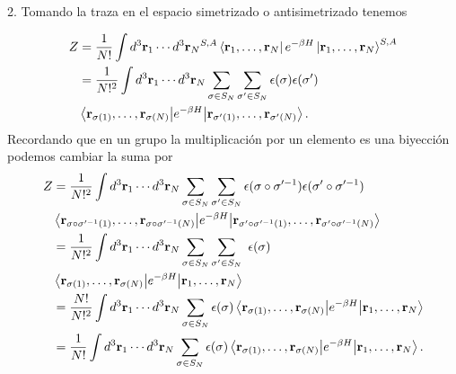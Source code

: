 \documentclass{article}
\begin{document}
2. Tomando la traza en el espacio simetrizado o antisimetrizado tenemos 

\begin{align}
\begin{split}
Z&=\frac{1}{N!}\int d^3\vb{r}_1\cdots d^3\vb{r}_N{}^{S,A}\bra{\vb{r}_{1},\dots,\vb{r}_{N}}e^{-\beta H}\ket{\vb{r}_{1},\dots,\vb{r}_{N}}^{S,A}\\
&=\frac{1}{N!^2}\int d^3\vb{r}_1\cdots d^3\vb{r}_N\sum_{\sigma\in S_N}\sum_{\sigma'\in S_N}\epsilon(\sigma)\epsilon(\sigma')\\
&\mel{\vb{r}_{\sigma(1)},\dots,\vb{r}_{\sigma(N)}}{e^{-\beta H}}{\vb{r}_{\sigma'(1)},\dots,\vb{r}_{\sigma'(N)}}.
\end{split}
\end{align}
Recordando que en un grupo la multiplicación por un elemento es una biyección podemos cambiar la suma por
\begin{align}
\begin{split}
Z&=\frac{1}{N!^2}\int d^3\vb{r}_1\cdots d^3\vb{r}_N\sum_{\sigma\in S_N}\sum_{\sigma'\in S_N}\epsilon(\sigma\circ\sigma'^{-1})\epsilon(\sigma'\circ\sigma'^{-1})\\
&\mel{\vb{r}_{\sigma\circ\sigma'^{-1}(1)},\dots,\vb{r}_{\sigma\circ\sigma'^{-1}(N)}}{e^{-\beta H}}{\vb{r}_{\sigma'\circ\sigma'^{-1}(1)},\dots,\vb{r}_{\sigma'\circ\sigma'^{-1}(N)}}\\
&=\frac{1}{N!^2}\int d^3\vb{r}_1\cdots d^3\vb{r}_N\sum_{\sigma\in S_N}\sum_{\sigma'\in S_N}\
\epsilon(\sigma)\\
&\mel{\vb{r}_{\sigma(1)},\dots,\vb{r}_{\sigma(N)}}{e^{-\beta H}}{\vb{r}_{1},\dots,\vb{r}_{N}}\\
&=\frac{N!}{N!^2}\int d^3\vb{r}_1\cdots d^3\vb{r}_N\sum_{\sigma\in S_N}
\epsilon(\sigma)\mel{\vb{r}_{\sigma(1)},\dots,\vb{r}_{\sigma(N)}}{e^{-\beta H}}{\vb{r}_{1},\dots,\vb{r}_{N}}\\
&=\frac{1}{N!}\int d^3\vb{r}_1\cdots d^3\vb{r}_N\sum_{\sigma\in S_N}
\epsilon(\sigma)\mel{\vb{r}_{\sigma(1)},\dots,\vb{r}_{\sigma(N)}}{e^{-\beta H}}{\vb{r}_{1},\dots,\vb{r}_{N}}.
\end{split}
\end{align}
\end{document}
